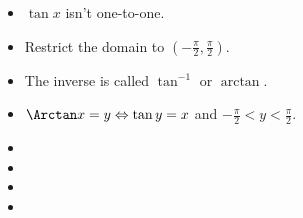 \begin{frame}
\begin{columns}[c]
\begin{itemize}
\item<1->  $\tan x$ isn't one-to-one.
\item<2->  Restrict the domain to $(-\frac{\pi}2, \frac{\pi}2)$.
\item<3->  The inverse is called $\tan^{-1}$ or $\arctan$.
\item<4->  $\Arctan x = y \Leftrightarrow \tan y = x$ and $-\frac{\pi}2 < y < \frac{\pi}2$.
\item<5->  
\item<5->  
\item<9->  
\item<9->  
\end{itemize}
\end{columns}
\end{frame}
